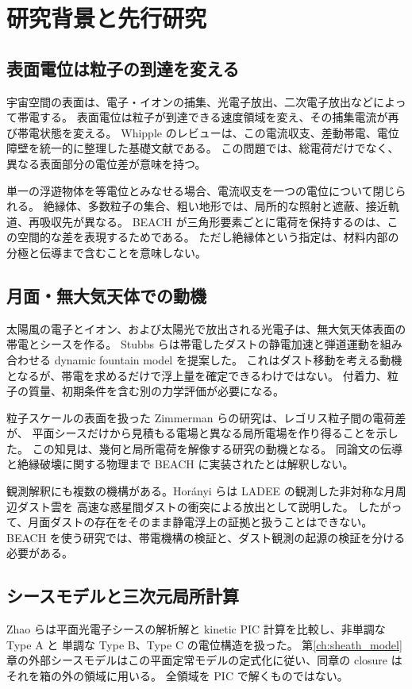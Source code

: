 \chapter{研究背景と先行研究}
\label{ch:background}

\section{表面電位は粒子の到達を変える}
宇宙空間の表面は、電子・イオンの捕集、光電子放出、二次電子放出などによって帯電する。
表面電位は粒子が到達できる速度領域を変え、その捕集電流が再び帯電状態を変える。
Whipple のレビューは、この電流収支、差動帯電、電位障壁を統一的に整理した基礎文献である\citep{Whipple1981}。
この問題では、総電荷だけでなく、異なる表面部分の電位差が意味を持つ。

単一の浮遊物体を等電位とみなせる場合、電流収支を一つの電位について閉じられる。
絶縁体、多数粒子の集合、粗い地形では、局所的な照射と遮蔽、接近軌道、再吸収先が異なる。
BEACH が三角形要素ごとに電荷を保持するのは、この空間的な差を表現するためである。
ただし絶縁体という指定は、材料内部の分極と伝導まで含むことを意味しない。

\section{月面・無大気天体での動機}
太陽風の電子とイオン、および太陽光で放出される光電子は、無大気天体表面の帯電とシースを作る。
Stubbs らは帯電したダストの静電加速と弾道運動を組み合わせる dynamic fountain model を提案した\citep{Stubbs2006}。
これはダスト移動を考える動機となるが、帯電を求めるだけで浮上量を確定できるわけではない。
付着力、粒子の質量、初期条件を含む別の力学評価が必要になる。

粒子スケールの表面を扱った Zimmerman らの研究は、レゴリス粒子間の電荷差が、
平面シースだけから見積もる電場と異なる局所電場を作り得ることを示した\citep{Zimmerman2016}。
この知見は、幾何と局所電荷を解像する研究の動機となる。
同論文の伝導と絶縁破壊に関する物理まで BEACH に実装されたとは解釈しない。

観測解釈にも複数の機構がある。Horányi らは LADEE の観測した非対称な月周辺ダスト雲を
高速な惑星間ダストの衝突による放出として説明した\citep{Horanyi2015}。
したがって、月面ダストの存在をそのまま静電浮上の証拠と扱うことはできない。
BEACH を使う研究では、帯電機構の検証と、ダスト観測の起源の検証を分ける必要がある。

\section{シースモデルと三次元局所計算}
Zhao らは平面光電子シースの解析解と kinetic PIC 計算を比較し、非単調な Type A と
単調な Type B、Type C の電位構造を扱った\citep{Zhao2020}。
第\ref{ch:sheath_model}章の外部シースモデルはこの平面定常モデルの定式化に従い、同章の closure はそれを箱の外の領域に用いる。
全領域を PIC で解くものではない。

